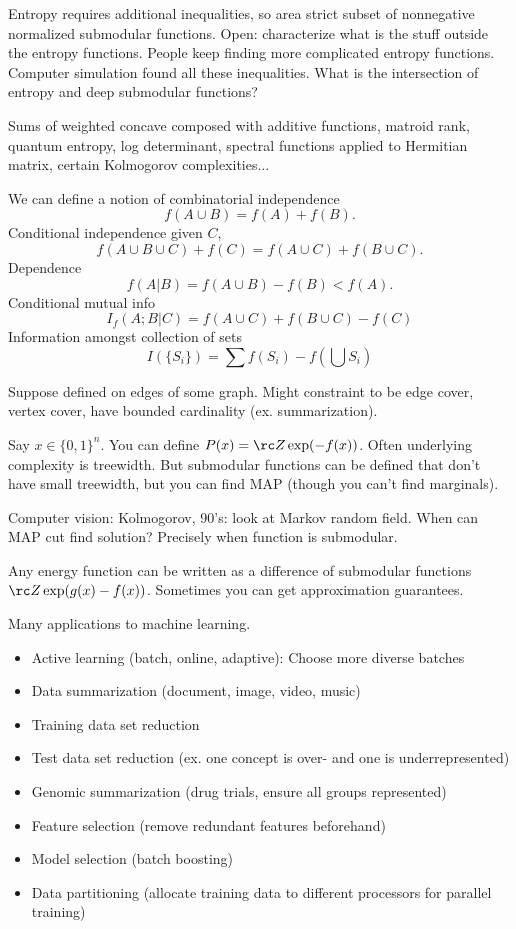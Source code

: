 Entropy requires additional inequalities, so area  strict subset of nonnegative normalized submodular functions.
Open: characterize what is the stuff outside the entropy functions. People keep finding more complicated entropy functions. Computer simulation found all these inequalities.
What is the intersection of entropy and deep submodular functions?

Sums of weighted concave composed with additive functions, matroid rank, quantum entropy, log determinant, spectral functions applied to Hermitian matrix, certain Kolmogorov complexities...

We can define a notion of combinatorial independence
$$
f(A\cup B) = f(A)+f(B).
$$
Conditional independence given $C$,
$$
f(A\cup B\cup C) + f(C) = f(A\cup C)+f(B\cup C).
$$
Dependence
$$
f(A|B) = f(A\cup B) - f(B) < f(A).
$$
Conditional mutual info
$$
I_f(A;B|C) = f(A\cup C) + f(B\cup C) - f(C)
$$
Information amongst collection of sets
$$
I(\{S_i\}) = \sum f(S_i) - f(\bigcup S_i) 
$$

Suppose defined on edges of some graph. Might  constraint to be edge cover, vertex cover, have bounded cardinality (ex. summarization). 

Say $x\in \{0,1\}^n$. You can define $P(x) = \rc Z \exp(-f(x))$. Often underlying complexity is treewidth. But submodular functions can be defined that don't have small treewidth, but you can find MAP (though you can't find marginals). 

Computer vision: Kolmogorov, 90's: look at Markov random field. When can MAP cut find solution? Precisely when function is submodular. 

Any energy function can be written as a difference of submodular functions $\rc Z \exp(g(x) - f(x))$. Sometimes you can get approximation guarantees.

Many applications to machine learning. %
\begin{itemize}
\item
Active learning (batch, online, adaptive): 
Choose more diverse batches
\item
Data summarization (document, image, video, music)
\item
Training data set reduction
\item
Test data set reduction (ex. one concept is over- and one is underrepresented)
\item
Genomic summarization (drug trials, ensure all groups represented)
\item
Feature selection (remove redundant features beforehand)
\item
Model selection (batch boosting)
\item
Data partitioning (allocate training data to different processors for parallel training)
\end{itemize}

